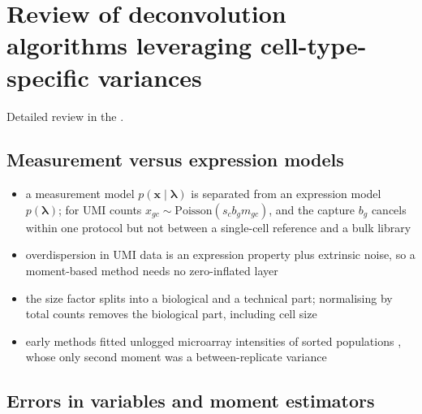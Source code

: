 \section{Review of deconvolution algorithms leveraging cell-type-specific variances}
\label{app:review}

Detailed review in the .

\subsection{Measurement versus expression models}

\begin{itemize}
  \item a measurement model \(p(\boldsymbol{x}\mid\boldsymbol{\lambda})\) is separated from an expression model
        \(p(\boldsymbol{\lambda})\); for UMI counts \(x_{gc}\sim\mathrm{Poisson}(s_{c}b_{g}m_{gc})\), and the capture
        \(b_{g}\) cancels within one protocol but not between a single-cell reference and a bulk library
        \cite{sarkarSeparatingMeasurementExpression2021}
  \item overdispersion in UMI data is an expression property plus extrinsic noise, so a moment-based method needs no
        zero-inflated layer
  \item the size factor splits into a biological and a technical part; normalising by total counts removes the
        biological part, including cell size \cite{fangExtrinsicBiologicalStochasticity2025}
  \item early methods fitted unlogged microarray intensities of sorted populations
        \cite{abbasDeconvolutionBloodMicroarray2009,shen-orrCellTypeSpecific2010,lahdesmakiSilicoMicrodissectionMicroarray2005},
        whose only second moment was a between-replicate variance
\end{itemize}

\subsection{Errors in variables and moment estimators}
\label{app:eiv}

